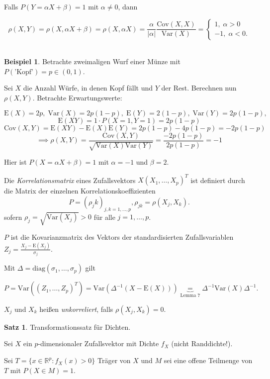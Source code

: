 \documentclass[12pt, a4paper]{article}
\newcommand{\E}{\mbox{I\negthinspace E}}
\theoremstyle{plain}
\theoremstyle{definition}
\newtheorem{satz}[thm]{Satz}
\newtheorem{beispiel}[thm]{Beispiel}
\newcommand{\R}{\mathbb{R}}
\newcommand{\1}{\mathds{1}}
\renewcommand{\E}{\mathrm{E}}
\newcommand{\Var}{\mathrm{Var}}
\newcommand{\Cov}{\mathrm{Cov}}
\newcommand{\diag}{\mathrm{diag}}
\providecommand{\abs}[1]{\lvert#1\rvert}
\begin{document}
Falls $P(Y = \alpha X + \beta) = 1$ mit $\alpha \neq 0$, dann

\[   \rho(X,Y) = \rho(X, \alpha X + \beta) = \rho(X, \alpha X) =  \frac{\alpha}{\abs{\alpha}} \frac{\Cov(X,X)}{\Var(X)} = \begin{cases} 1, \; \alpha > 0 \\ -1, \; \alpha < 0. \end{cases}   \]\\

\begin{beispiel} Betrachte zweimaligen Wurf einer Münze mit $P(\text{'Kopf'}) = p \in (0,1)$.\end{beispiel}

Sei $X$ die Anzahl Würfe, in denen Kopf fällt und $Y$ der Rest. Berechnen nun $\rho(X,Y)$. Betrachte Erwartungswerte:

\[  \E(X) = 2p, \; \Var(X) = 2p(1-p), \; \E(Y) = 2(1-p), \; \Var(Y) = 2p(1-p), \]
\[ \E(XY) = 1 \cdot P(X=1, Y=1) = 2p(1-p)     \]
\[  \Cov(X,Y) = \E(XY) - \E(X)\E(Y) = 2p(1-p) - 4p(1-p) = -2p(1-p) \]
\[ \implies \rho(X,Y) = \frac{\Cov(X,Y)}{\sqrt{\Var(X)\Var(Y)}} = \frac{-2p(1-p)}{2p(1-p)} = -1  \]


Hier ist $P(X=\alpha X + \beta) = 1$ mit $\alpha = -1$ und $\beta = 2$. 

Die \emph{Korrelationsmatrix} eines Zufallsvektors $X (X_1, \ldots, X_p)^T$ ist definiert durch die Matrix der einzelnen Korrelationskoeffizienten 
\[  P = (\rho_jk)_{j,k = 1,\ldots,p} , \rho_{jk} = \rho(X_j, X_k) . \] sofern $\rho_j = \sqrt{\Var(X_j)}>0$ für alle $j=1,\ldots,p$.


$P$ ist die Kovarianzmatrix des Vektors der standardisierten Zufallsvariablen \(  Z_j = \frac{ X_j - \E(X_j) }{ \sigma_j  }  .  \)

Mit $\Delta = \diag(\sigma_1,\ldots, \sigma_p)$ gilt

\[ P = \Var ((Z_1, \ldots, Z_p)^T) = \Var( \Delta^{-1}(X-\E(X))) \underbrace{=}_{\text{Lemma 7}} \Delta^{-1} \Var(X) \Delta^{-1} .    \]

$X_j$ und $X_k$ heißen \emph{unkorreliert}, falls $\rho(X_j, X_k) = 0$.\\

\begin{satz}Transformationssatz für Dichten. \end{satz}

Sei $X$ ein $p$-dimensionaler Zufallsvektor mit Dichte $f_X$ (nicht Randdichte!).

Sei  $T = \{ x \in \R^p: f_X (x) > 0  \}$ Träger von $X$ und $M$ sei eine offene Teilmenge von $T$ mit $P(X \in M) = 1$.
\end{document}
